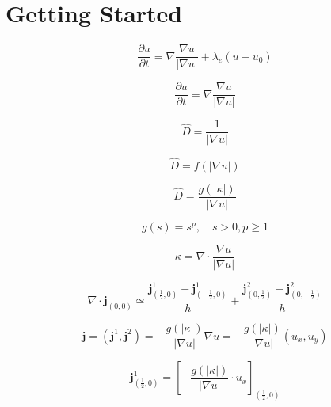 \chapter{Getting Started}
\begin{equation}
\frac{\partial u}{\partial t} = \nabla \frac{\nabla u}{|\nabla u|}+\lambda_e\left(u-u_0 \right)
\end{equation}

\begin{equation}
\frac{\partial u}{\partial t} = \nabla \frac{\nabla u}{|\nabla u|}
\end{equation}

\begin{equation}
\hat{D} = \frac{1}{|\nabla u|}
\end{equation}

\begin{equation}
\hat{D} = f\left(|\nabla u|\right)
\end{equation}

\begin{equation}
\hat{D} = \frac{g\left(|\kappa|\right)}{|\nabla u|}
\end{equation}


 
\begin{equation}
g(s) = s^p, \quad s>0, p\geq1
\end{equation}

\begin{equation}
\kappa = \nabla \cdot  \frac{\nabla u}{|\nabla u|}
\end{equation}

\begin{equation}
\nabla  \cdot  \textbf{j}_{(0,0)} \simeq \frac{\textbf{j}^1_{(\frac{1}{2},0)}-\textbf{j}^1_{(-\frac{1}{2},0)}}{h}+\frac{\textbf{j}^2_{(0,\frac{1}{2})}-\textbf{j}^2_{(0,-\frac{1}{2})}}{h}
\end{equation}

\begin{equation}
\textbf{j} = (\textbf{j}^1,\textbf{j}^2) = - \frac{g(|\kappa|)}{|\nabla u|} \nabla u = - \frac{g(|\kappa|)}{|\nabla u|} (u_x,u_y)
\end{equation}

\begin{equation}
\textbf{j}^1_{(\frac{1}{2},0)} = \left[- \frac{g(|\kappa|)}{|\nabla u|} \cdot u_x \right]_{(\frac{1}{2},0)}
\end{equation}

